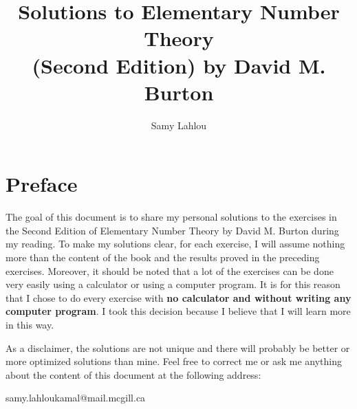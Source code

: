 \documentclass[12pt, oneside]{book}
\title{Solutions to Elementary Number Theory \\ (Second Edition) by David M. Burton}
\author{Samy Lahlou}
\newcounter{exercise}[section] %
\begin{document}
\maketitle

\chapter*{Preface}

The goal of this document is to share my personal solutions to the exercises in the Second Edition of Elementary Number Theory by David M. Burton during my reading. To make my solutions clear, for each exercise, I will assume nothing more than the content of the book and the results proved in the preceding exercises. Moreover, it should be noted that a lot of the exercises can be done very easily using a calculator or using a computer program. It is for this reason that I chose to do every exercise with \textbf{no calculator and without writing any computer program}. I took this decision because I believe that I will learn more in this way.

As a disclaimer, the solutions are not unique and there will probably be better or more optimized solutions than mine. Feel free to correct me or ask me anything about the content of this document at the following address: 

samy.lahloukamal@mail.mcgill.ca

\tableofcontents

























\end{document}
